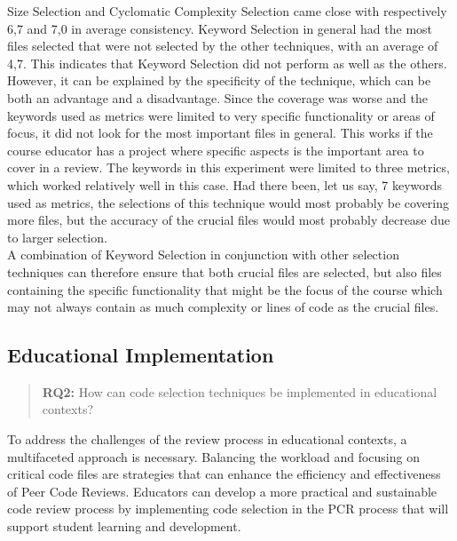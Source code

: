 Size Selection and Cyclomatic Complexity Selection came close with respectively 6,7 and 7,0 in average consistency. Keyword Selection in general had the most files selected that were not selected by the other techniques, with an average of 4,7. This indicates that Keyword Selection did not perform as well as the others. However, it can be explained by the specificity of the technique, which can be both an advantage and a disadvantage. Since the coverage was worse and the keywords used as metrics were limited to very specific functionality or areas of focus, it did not look for the most important files in general. This works if the course educator has a project where specific aspects is the important area to cover in a review.
The keywords in this experiment were limited to three metrics, which worked relatively well in this case. Had there been, let us say, 7 keywords used as metrics, the selections of this technique would most probably be covering more files, but the accuracy of the crucial files would most probably decrease due to larger selection. \\

A combination of Keyword Selection in conjunction with other selection techniques can therefore ensure that both crucial files are selected, but also files containing the specific functionality that might be the focus of the course which may not always contain as much complexity or lines of code as the crucial files. \\




\subsection{Educational Implementation} \label{Educational_Implementation}
\begin{quote}
    \textbf{RQ2:} How can code selection techniques be implemented in educational contexts?
\end{quote}

To address the challenges of the review process in educational contexts, a multifaceted approach is necessary. Balancing the workload and focusing on critical code files are strategies that can enhance the efficiency and effectiveness of Peer Code Reviews. Educators can develop a more practical and sustainable code review process by implementing code selection in the PCR process that will support student learning and development. \\

